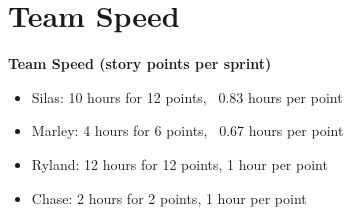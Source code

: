 \section{Team Speed}
\textbf{Team Speed (story points per sprint)}
\begin{itemize}
    \item Silas: 10 hours for 12 points, ~0.83 hours per point
    \item Marley: 4 hours for 6 points, ~0.67 hours per point
    \item Ryland: 12 hours for 12 points, 1 hour per point
    \item Chase: 2 hours for 2 points, 1 hour per point
\end{itemize}